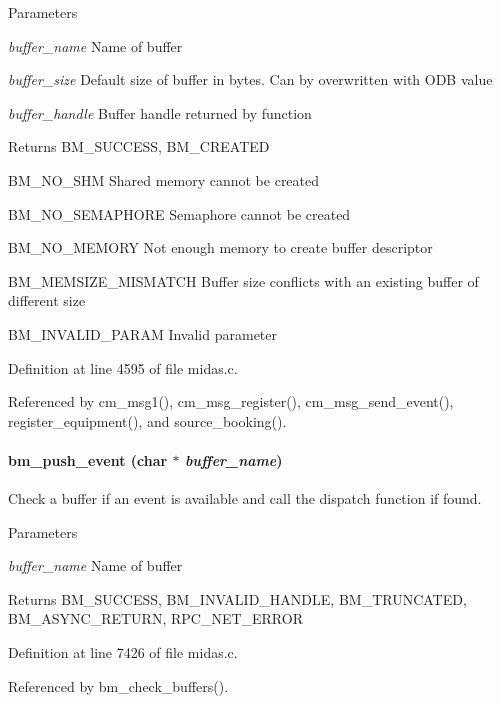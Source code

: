 \begin{DoxyParams}{Parameters}
\item[{\em buffer\_\-name}]Name of buffer \item[{\em buffer\_\-size}]Default size of buffer in bytes. Can by overwritten with ODB value \item[{\em buffer\_\-handle}]Buffer handle returned by function \end{DoxyParams}
\begin{DoxyReturn}{Returns}
BM\_\-SUCCESS, BM\_\-CREATED \par
 BM\_\-NO\_\-SHM Shared memory cannot be created \par
 BM\_\-NO\_\-SEMAPHORE Semaphore cannot be created \par
 BM\_\-NO\_\-MEMORY Not enough memory to create buffer descriptor \par
 BM\_\-MEMSIZE\_\-MISMATCH Buffer size conflicts with an existing buffer of different size \par
 BM\_\-INVALID\_\-PARAM Invalid parameter 
\end{DoxyReturn}


Definition at line 4595 of file midas.c.

Referenced by cm\_\-msg1(), cm\_\-msg\_\-register(), cm\_\-msg\_\-send\_\-event(), register\_\-equipment(), and source\_\-booking().
\paragraph[{bm\_\-push\_\-event}]{ bm\_\-push\_\-event (char $\ast$ {\em buffer\_\-name})}\hfill\label{group__bmfunctionc_gabcc6bb732b720fcc3ffe859f732a07e0}
Check a buffer if an event is available and call the dispatch function if found. 
\begin{DoxyParams}{Parameters}
\item[{\em buffer\_\-name}]Name of buffer \end{DoxyParams}
\begin{DoxyReturn}{Returns}
BM\_\-SUCCESS, BM\_\-INVALID\_\-HANDLE, BM\_\-TRUNCATED, BM\_\-ASYNC\_\-RETURN, RPC\_\-NET\_\-ERROR 
\end{DoxyReturn}


Definition at line 7426 of file midas.c.

Referenced by bm\_\-check\_\-buffers().
